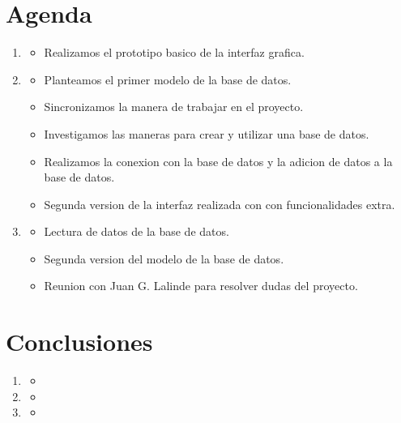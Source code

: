 \documentclass{article}
\begin{document}
    \section*{Agenda}
        \begin{enumerate}
            \item
            \begin{itemize}
                \item Realizamos el prototipo basico de la interfaz grafica.
            \end{itemize}
            \item
            \begin{itemize}
                \item Planteamos el primer modelo de la base de datos. 
                \item Sincronizamos la manera de trabajar en el proyecto.
                \item Investigamos las maneras para crear y utilizar una base
                      de datos.
                \item Realizamos la conexion con la base de datos y la adicion
                      de datos a la base de datos.
                \item Segunda version de la interfaz realizada con 
                      con funcionalidades extra.
            \end{itemize}
            \item 
            \begin{itemize}
                \item Lectura de datos de la base de datos.
                \item Segunda version del modelo de la base de datos.
                \item Reunion con Juan G. Lalinde para resolver dudas del
                      proyecto.
            \end{itemize}
        \end{enumerate}

    \section*{Conclusiones}
        \begin{enumerate}
            \item
            \begin{itemize}
                \item 
            \end{itemize}
            \item
            \begin{itemize}
                \item 
            \end{itemize}
            \item 
            \begin{itemize}
                \item 
            \end{itemize}
        \end{enumerate}
\end{document}
